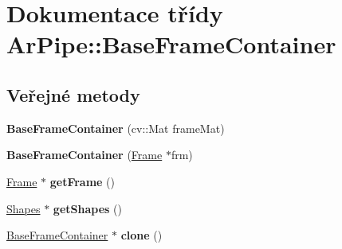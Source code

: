 \hypertarget{class_ar_pipe_1_1_base_frame_container}{\section{Dokumentace třídy Ar\-Pipe\-:\-:Base\-Frame\-Container}
\label{da/d35/class_ar_pipe_1_1_base_frame_container}
}
\subsection*{Veřejné metody}
\begin{DoxyCompactItemize}
\item 
\hypertarget{class_ar_pipe_1_1_base_frame_container_a473f29983266b94c82017782df89ce49}{{\bfseries Base\-Frame\-Container} (cv\-::\-Mat frame\-Mat)}\label{da/d35/class_ar_pipe_1_1_base_frame_container_a473f29983266b94c82017782df89ce49}

\item 
\hypertarget{class_ar_pipe_1_1_base_frame_container_ac7699fdd241a920e0e88a5f6f6ff5edc}{{\bfseries Base\-Frame\-Container} (\hyperlink{class_ar_pipe_1_1_frame}{Frame} $\ast$frm)}\label{da/d35/class_ar_pipe_1_1_base_frame_container_ac7699fdd241a920e0e88a5f6f6ff5edc}

\item 
\hypertarget{class_ar_pipe_1_1_base_frame_container_a789cc2cf1545414b1ef169f66cd908b7}{\hyperlink{class_ar_pipe_1_1_frame}{Frame} $\ast$ {\bfseries get\-Frame} ()}\label{da/d35/class_ar_pipe_1_1_base_frame_container_a789cc2cf1545414b1ef169f66cd908b7}

\item 
\hypertarget{class_ar_pipe_1_1_base_frame_container_af9a7c9b39dfd1d54a69b32e5bffbc1f6}{\hyperlink{class_ar_pipe_1_1_shapes}{Shapes} $\ast$ {\bfseries get\-Shapes} ()}\label{da/d35/class_ar_pipe_1_1_base_frame_container_af9a7c9b39dfd1d54a69b32e5bffbc1f6}

\item 
\hypertarget{class_ar_pipe_1_1_base_frame_container_acedbe9f0b649343f08753a77dcb80506}{\hyperlink{class_ar_pipe_1_1_base_frame_container}{Base\-Frame\-Container} $\ast$ {\bfseries clone} ()}\label{da/d35/class_ar_pipe_1_1_base_frame_container_acedbe9f0b649343f08753a77dcb80506}

\end{DoxyCompactItemize}
